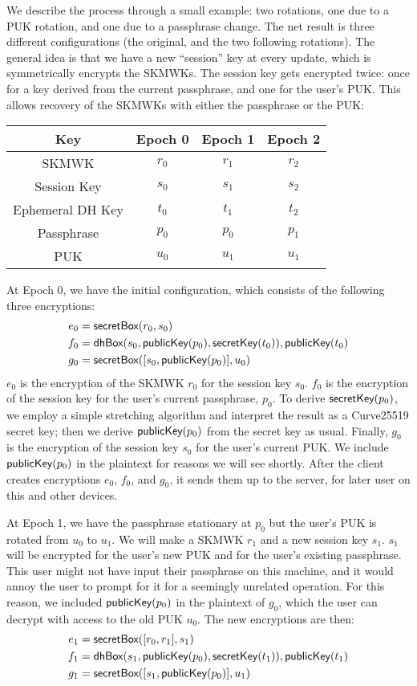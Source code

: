 We describe the process through a small example: two rotations, one due to a PUK rotation,
and one due to a passphrase change. The net result is three different configurations
(the original, and the two following rotations). The general idea is that we have a new ``session''
key at every update, which is symmetrically encrypts the SKMWKs. The session key gets encrypted
twice: once for a key derived from the current passphrase, and one for the user's PUK. This
allows recovery of the SKMWKs with either the passphrase or the PUK:
%
  \begin{center}
  \begin{tabular}{|c|c|c|c|}
    \hline
     Key & Epoch 0 & Epoch 1 & Epoch 2 \\
     \hline
     \hline
      SKMWK & $r_0$ & $r_1$ & $r_2$ \\
      Session Key & $s_0$ & $s_1$ & $s_2$ \\
      Ephemeral DH Key & $t_0$ & $t_1$ & $t_2$ \\
      Passphrase & $p_0$ & $p_0$ & $p_1$ \\
      PUK & $u_0$ & $u_1$ & $u_1$ \\
     \hline
  \end{tabular}
\end{center}
%
At Epoch 0, we have the initial configuration, which consists of the following three encryptions:
%
\begin{align*}
e_0 &= \textsf{secretBox}(r_0, s_0) \\
f_0 &= \textsf{dhBox}(s_0, \textsf{publicKey}(p_0), \textsf{secretKey}(t_0)), \textsf{publicKey}(t_0) \\
g_0 &= \textsf{secretBox}([s_0,\textsf{publicKey}(p_0)], u_0) \\
\end{align*}
%
$e_0$ is the encryption of the SKMWK $r_0$ for the session key $s_0$.  $f_0$ is the encryption 
of the session key for the user's current passphrase, $p_0$. To derive $\textsf{secretKey}(p_0)$, we employ
a simple stretching algorithm and interpret the result as a Curve25519 secret key; then we
derive $\textsf{publicKey}(p_0)$ from the secret key as usual. Finally, $g_0$ is the encryption of the session
key $s_0$ for the user's current PUK. We include $\textsf{publicKey}(p_0)$ in the plaintext for reasons
we will see shortly. After the client creates encryptions $e_0$, $f_0$, and $g_0$, it sends them
up to the server, for later user on this and other devices.

At Epoch 1, we have the passphrase stationary at $p_0$  but the user's PUK is rotated from $u_0$ to $u_1$.
We will make a SKMWK $r_1$ and a new session key $s_1$. $s_1$ will be encrypted for the user's
new PUK and for the user's existing passphrase. This user might not have input their
passphrase on this machine, and it would annoy the user to prompt for it for a seemingly
unrelated operation. For this reason, we included $\textsf{publicKey}(p_0)$ in the plaintext of $g_0$, which
the user can decrypt with access to the old PUK $u_0$. The new encryptions are then:
%
\begin{align*}
e_1 &= \textsf{secretBox}([r_0,r_1], s_1) \\
f_1 &= \textsf{dhBox}(s_1, \textsf{publicKey}(p_0), \textsf{secretKey}(t_1)), \textsf{publicKey}(t_1) \\
g_1 &= \textsf{secretBox}([s_1,\textsf{publicKey}(p_0)], u_1) \\
\end{align*}

